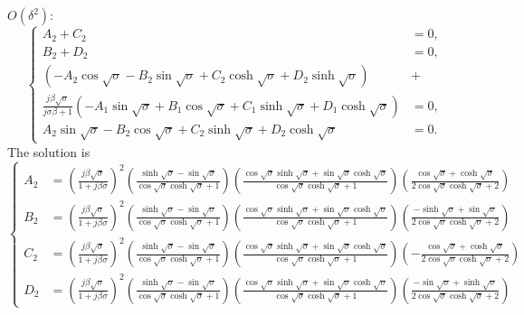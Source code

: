 \documentclass{article}
\begin{document}
\noindent
$O(\delta^2)$:
\begin{equation}
    \left\{\begin{aligned}
        A_2 + C_2 &= 0, \\
        B_2 + D_2 &= 0, \\
        \left( - A_2 \cos{\sqrt{\sigma}} - B_2 \sin{\sqrt{\sigma}} + C_2 \cosh{\sqrt{\sigma}} + D_2 \sinh{\sqrt{\sigma}} \right) &+ \\
        \frac{j \beta \sqrt{\sigma}}{ j\sigma \beta + 1 } \left( - A_1 \sin{\sqrt{\sigma}} + B_1 \cos{\sqrt{\sigma}} + C_1 \sinh{\sqrt{\sigma}} + D_1 \cosh{\sqrt{\sigma}} \right) &= 0, \\
        A_2 \sin{\sqrt{\sigma}} - B_2 \cos{\sqrt{\sigma}} + C_2 \sinh{\sqrt{\sigma}} + D_2 \cosh{\sqrt{\sigma}} &= 0.
    \end{aligned}\right.
\end{equation}
The solution is
\scriptsize
\begin{equation}
    \left\{\begin{aligned}
        A_2 &= \left( \frac{j \beta \sqrt{\sigma }}{1+j \beta \sigma } \right)^2 \left(\frac{ \sinh\sqrt{\sigma } - \sin\sqrt{\sigma }}{\cos\sqrt{\sigma } \cosh\sqrt{\sigma }+1} \right) \left( \frac{\cos\sqrt{\sigma } \sinh\sqrt{\sigma }+\sin\sqrt{\sigma } \cosh\sqrt{\sigma }}{\cos\sqrt{\sigma } \cosh\sqrt{\sigma }+1} \right) \left(\frac{\cos\sqrt{\sigma }+\cosh\sqrt{\sigma }}{2 \cos\sqrt{\sigma }\cosh\sqrt{\sigma }+2} \right) \\
        B_2 &= \left( \frac{j \beta \sqrt{\sigma }}{1+j \beta \sigma } \right)^2 \left(\frac{\sinh\sqrt{\sigma } - \sin\sqrt{\sigma }}{\cos\sqrt{\sigma } \cosh\sqrt{\sigma }+1} \right) \left( \frac{\cos\sqrt{\sigma } \sinh\sqrt{\sigma }+\sin\sqrt{\sigma } \cosh\sqrt{\sigma }}{\cos\sqrt{\sigma } \cosh\sqrt{\sigma }+1} \right) \left( \frac{-\sinh\sqrt{\sigma }+\sin\sqrt{\sigma }}{2 \cos\sqrt{\sigma }\cosh\sqrt{\sigma }+2} \right)\\
        C_2 &= \left( \frac{j \beta \sqrt{\sigma }}{1+j \beta \sigma } \right)^2 \left(\frac{\sinh\sqrt{\sigma } - \sin\sqrt{\sigma }}{\cos\sqrt{\sigma } \cosh\sqrt{\sigma }+1} \right) \left( \frac{\cos\sqrt{\sigma } \sinh\sqrt{\sigma }+\sin\sqrt{\sigma } \cosh\sqrt{\sigma }}{\cos\sqrt{\sigma } \cosh\sqrt{\sigma }+1} \right) \left( -\frac{\cos\sqrt{\sigma }+\cosh\sqrt{\sigma }}{2 \cos\sqrt{\sigma } \cosh\sqrt{\sigma }+2} \right)\\
        D_2 &= \left( \frac{j \beta \sqrt{\sigma }}{1+j \beta \sigma } \right)^2 \left(\frac{\sinh\sqrt{\sigma } - \sin\sqrt{\sigma }}{\cos\sqrt{\sigma } \cosh\sqrt{\sigma }+1} \right) \left( \frac{\cos\sqrt{\sigma } \sinh\sqrt{\sigma }+\sin\sqrt{\sigma } \cosh\sqrt{\sigma }}{\cos\sqrt{\sigma } \cosh\sqrt{\sigma }+1} \right) \left( \frac{-\sin\sqrt{\sigma }+\sinh\sqrt{\sigma }}{2 \cos\sqrt{\sigma }\cosh\sqrt{\sigma }+2} \right)
    \end{aligned}\right.
\end{equation}
\normalsize
\end{document}
